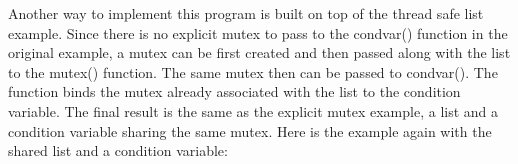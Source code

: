 
Another way to implement this program is built on top of the thread safe
list example. Since there is no explicit mutex to pass to the
\textsf{condvar()} function in the original example, a mutex
can be first created and then passed along with the list to the
\textsf{mutex()} function. The same mutex then can be passed
to \textsf{condvar()}. The function binds the mutex already
associated with the list to the condition variable. The final result is
the same as the explicit mutex example, a list and a condition variable
sharing the same mutex. Here is the example again with the shared list
and a condition variable:


